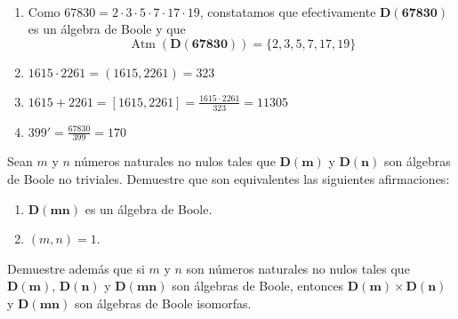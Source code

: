 \begin{solution}~
  \begin{enumerate}
  \item Como $67830=2\cdot 3\cdot 5\cdot 7\cdot 17\cdot 19$,
    constatamos que efectivamente $\mathbf{D(67830)}$ es un álgebra de
    Boole y que
    \begin{equation*}
      \operatorname{Atm}(\mathbf{D(67830)})=
      \{2,3,5,7,17,19\}
    \end{equation*}
  \item $1615\cdot 2261=(1615,2261)=323$
  \item $1615+2261=[1615,2261]=\frac{1615\cdot 2261}{323}=11305$
  \item $399'=\frac{67830}{399}=170$
  \end{enumerate}
\end{solution}

\begin{exercise}
  Sean $m$ y $n$ números naturales no nulos tales que $\mathbf{D(m)}$
  y $\mathbf{D(n)}$ son álgebras de Boole no triviales. Demuestre que
  son equivalentes las siguientes afirmaciones:
  \begin{enumerate}
  \item $\mathbf{D(mn)}$ es un álgebra de Boole.
  \item $(m,n)=1$.
  \end{enumerate}
  Demuestre además que si $m$ y $n$ son números naturales no nulos
  tales que $\mathbf{D(m)}$, $\mathbf{D(n)}$ y $\mathbf{D(mn)}$ son
  álgebras de Boole, entonces $\mathbf{D(m)}\times\mathbf{D(n)}$ y
  $\mathbf{D(mn)}$ son álgebras de Boole isomorfas.
\end{exercise}
  

